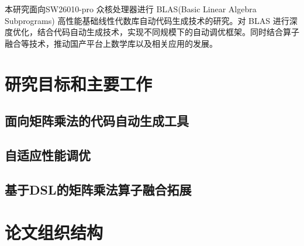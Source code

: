 本研究面向SW26010-pro 众核处理器进行 BLAS(Basic Linear Algebra Subprograms) 高性能基础线性代数库自动代码生成技术的研究。对 BLAS 进行深度优化，结合代码自动生成技术，实现不同规模下的自动调优框架。同时结合算子融合等技术，推动国产平台上数学库以及相关应用的发展。

\section{研究目标和主要工作}

\subsection{面向矩阵乘法的代码自动生成工具}




\subsection{自适应性能调优}


\subsection{基于DSL的矩阵乘法算子融合拓展}


\section{论文组织结构}
